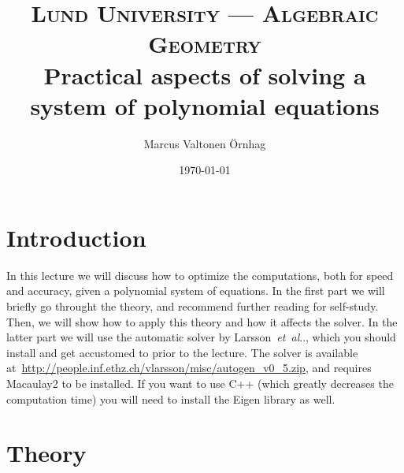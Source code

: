 \documentclass[11pt,a4paper]{article}
\title{
\normalfont \normalsize
\textsc{Lund University --- Algebraic Geometry} \\ [7pt]
\Large Practical aspects of solving a system of polynomial equations \\
}
\author{Marcus Valtonen \"{O}rnhag} %
\date{\normalsize\today} %
\makeatletter
\DeclareRobustCommand\etal{\emph{et~al}\@ifnextchar.{}{.\@}}
\makeatother
\begin{document}
\maketitle %

\section{Introduction}
In this lecture we will discuss how to optimize the computations, both for speed and
accuracy, given a polynomial system of equations. In the first part we will briefly go
throught the theory, and recommend further reading for self-study. Then, we will show
how to apply this theory and how it affects the solver. In the latter part we will use the
automatic solver by Larsson~\etal{}, which you should install and get accustomed to prior
to the lecture. The solver is available at~\url{http://people.inf.ethz.ch/vlarsson/misc/autogen_v0_5.zip}, and requires Macaulay2 to be installed. If you want to use C++ (which greatly decreases the computation time) you will need to install the Eigen library as well.

\section{Theory}
\end{document}
